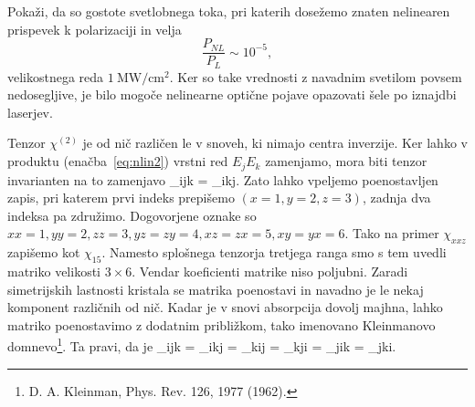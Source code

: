 \begin{definition}
Pokaži, da so gostote svetlobnega toka, pri katerih dosežemo znaten nelinearen 
prispevek k polarizaciji in velja
 $$\frac{P_{NL}}{P_L} \sim 10^{-5},$$
velikostnega reda $1~\si{\mega\watt/\centi\metre^2}$. 
Ker so take vrednosti z navadnim svetilom povsem nedosegljive, je bilo mogoče nelinearne
optične pojave opazovati šele po iznajdbi laserjev.
\end{definition}
 
Tenzor $\chi^{(2)}$ je od nič različen le v snoveh, ki nimajo centra inverzije. 
Ker lahko v produktu (enačba~\ref{eq:nlin2}) vrstni red $E_j E_k$ zamenjamo, mora biti
tenzor invarianten na to zamenjavo
\beq
\chi_{ijk} = \chi_{ikj}.
\label{eq:chijk}
\eeq
Zato lahko vpeljemo poenostavljen zapis, pri katerem prvi indeks prepišemo $(x = 1, y = 2, z = 3)$,
zadnja dva indeksa pa združimo. Dogovorjene oznake so $xx = 1, yy = 2, zz = 3, yz = zy =4, 
xz = zx =5, xy = yx = 6$. Tako na primer $\chi_{xxz}$ zapišemo kot $\chi_{15}$. Namesto
splošnega tenzorja tretjega ranga smo s tem uvedli matriko velikosti $3\times6$. 
Vendar koeficienti matrike niso poljubni. Zaradi simetrijskih lastnosti kristala se matrika
poenostavi in navadno je le nekaj komponent različnih od nič. 
Kadar je v snovi absorpcija dovolj majhna, lahko matriko poenostavimo
z dodatnim približkom, tako imenovano  
 Kleinmanovo domnevo\footnote{D. A. Kleinman, Phys. Rev. 126, 1977 (1962).}.
Ta pravi, da je 
\beq
\chi_{ijk} = \chi_{ikj} = \chi_{kij} = \chi_{kji} = \chi_{jik} = \chi_{jki}.
\label{Klein}
\eeq

